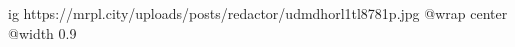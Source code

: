  
 
 
 
 

\ifcmt
  ig https://mrpl.city/uploads/posts/redactor/udmdhorl1tl8781p.jpg
  @wrap center
  @width 0.9
\fi
